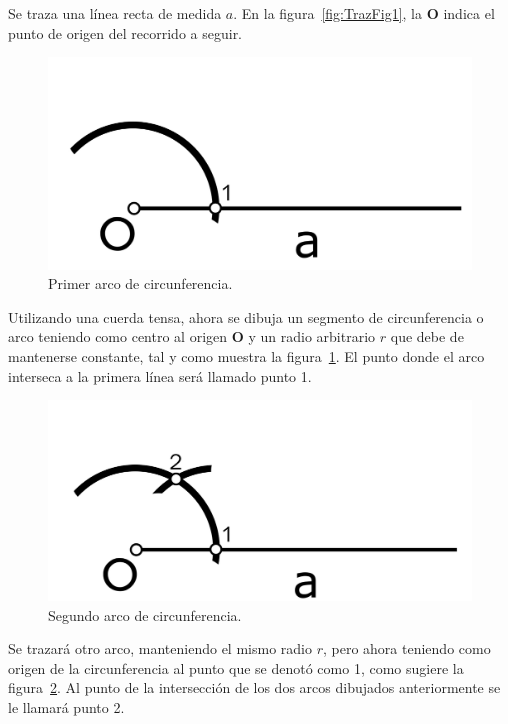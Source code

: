 Se traza una línea recta de medida $a$. En la figura~\ref{fig:TrazFig1}, la \textbf{O} indica el punto de origen del recorrido a seguir.\\

\begin{figure}[H]
\centering
\includegraphics[scale=0.95]{Figures/Cuad2}
\caption[Primer arco de circunferencia.]{Primer arco de circunferencia.}
\label{fig:TrazFig2}
\end{figure}

Utilizando una cuerda tensa, ahora se dibuja un segmento de circunferencia o arco teniendo como centro al origen \textbf{O} y un radio arbitrario $r$ que debe de mantenerse constante, tal y como muestra la figura~\ref{fig:TrazFig2}. El punto donde el arco interseca a la primera línea será llamado punto 1. 

\begin{figure}[H]
\centering
\includegraphics[scale=0.95]{Figures/Cuad3}
\caption[Segundo arco de circunferencia.]{Segundo arco de circunferencia.}
\label{fig:TrazFig3}
\end{figure}

Se trazará otro arco, manteniendo el mismo radio $r$, pero ahora teniendo como origen de la circunferencia al punto que se denotó como 1, como sugiere la figura~\ref{fig:TrazFig3}. Al punto de la intersección de los dos arcos dibujados anteriormente se le llamará punto 2.

